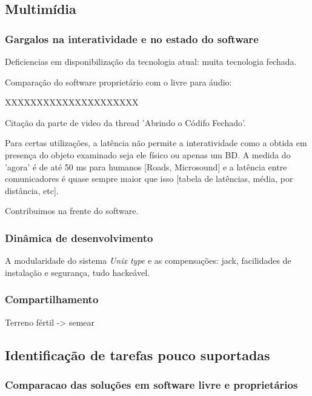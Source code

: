 \subsection{Multimídia}

\subsubsection{Gargalos na interatividade e no estado do software}
\label{sec:gargalos}

Deficiencias em disponibilização da tecnologia atual: muita
tecnologia fechada.

Comparação do software proprietário com o livre para áudio:

XXXXXXXXXXXXXXXXXXXXX

Citação da parte de video da thread 'Abrindo o Códifo Fechado'.

Para certas utilizações, a latência não permite a interatividade como 
a obtida em presença do objeto examinado seja ele físico ou apenas um BD.
A medida do 'agora' é de até 50 ms para humanos [Roads, Microsound] e a latência entre comunicadores é
quase sempre maior que isso [tabela de latências, média, por distância, etc].

Contribuimos na frente do software.


\subsubsection{Dinâmica de desenvolvimento}
\label{sec:din_dev}

A modularidade do sistema \emph{Unix type} e as compensações: jack,
facilidades de instalação e segurança, tudo hackeável.

\subsubsection{Compartilhamento}
\label{sec:comp_tec}

Terreno fértil -> semear

\subsection{Identificação de tarefas pouco suportadas}
\label{sec:tarefas_n_sup}

\subsubsection{Comparacao das soluções em software livre e proprietários}
\label{sec:sl_prop}


